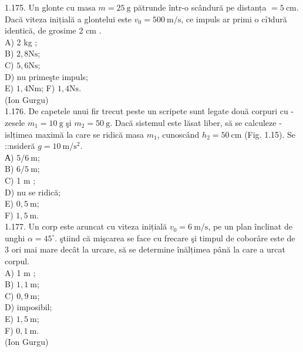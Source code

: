 \documentclass[10pt]{article}
\begin{document}
1.175. Un glonte cu masa $m=25 \mathrm{~g}$ pătrunde într-o scândură pe distanța $=5 \mathrm{~cm}$. Dacă viteza inițială a glontelui este $v_{0}=500 \mathrm{~m} / \mathrm{s}$, ce impuls ar primi o cỉาdură identică, de grosime 2 cm .\\
A) 2 kg ;\\
B) $2,8 \mathrm{Ns}$;\\
C) $5,6 \mathrm{Ns}$;\\
D) nu primeşte impuls;\\
E) $1,4 \mathrm{Nm}$; F) $1,4 \mathrm{Ns}$.\\
(Ion Gurgu)\\
1.176. De capetele unui fir trecut peste un scripete sunt legate două corpuri cu - zesele $m_{1}=10 \mathrm{~g}$ şi $m_{2}=50 \mathrm{~g}$. Dacă sistemul este lăsat liber, să se calculeze -islțimea maximă la care se ridică masa $m_{1}$, cunoscând $h_{2}=50 \mathrm{~cm}$ (Fig. 1.15). Se ::nsideră $g=10 \mathrm{~m} / \mathrm{s}^{2}$.\\
А) $5 / 6 \mathrm{~m}$;\\
B) $6 / 5 \mathrm{~m}$;\\
C) 1 m ;\\
D) nu se ridică;\\
E) $0,5 \mathrm{~m}$;\\
F) $1,5 \mathrm{~m}$.\\
1.177. Un corp este aruncat cu viteza inițială $v_{0}=6 \mathrm{~m} / \mathrm{s}$, pe un plan înclinat de unghi $\alpha=45^{\circ}$. ştiind că mişcarea se face cu frecare şi timpul de coborâre este de 3 ori mai mare decât la urcare, să se determine înălțimea până la care a urcat corpul.\\
A) 1 m ;\\
B) $1,1 \mathrm{~m}$;\\
C) $0,9 \mathrm{~m}$;\\
D) imposibil;\\
E) $1,5 \mathrm{~m}$;\\
F) $0,1 \mathrm{~m}$.\\
(Ion Gurgu)\\
\end{document}
